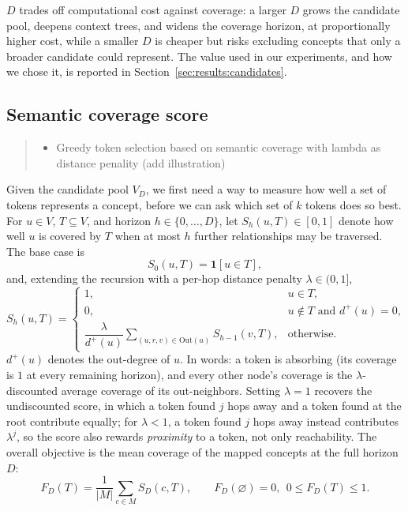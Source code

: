 $D$ trades off computational cost against coverage: a larger $D$ grows the
candidate pool, deepens context trees, and widens the coverage horizon, at
proportionally higher cost, while a smaller $D$ is cheaper but risks
excluding concepts that only a broader candidate could represent. The
value used in our experiments, and how we chose it, is reported in
Section~\ref{sec:results:candidates}.

\subsection{Semantic coverage score}
\label{sec:method:score}
\begin{quote}\small\itshape
\begin{itemize}
\item Greedy token selection based on semantic coverage with lambda as distance penality (add illustration)
\end{itemize}
\end{quote}
Given the candidate pool $V_D$, we first need a way to measure how well a
set of tokens represents a concept, before we can ask which set of $k$
tokens does so best. For $u \in V$, $T \subseteq V$, and horizon
$h \in \{0, \dots, D\}$, let $S_h(u, T) \in [0, 1]$ denote how well $u$ is
covered by $T$ when at most $h$ further relationships may be traversed. The
base case is
\[
S_0(u, T) = \mathbf{1}[u \in T],
\]
and, extending the recursion with a per-hop distance penalty $\lambda \in
(0, 1]$,
\begin{equation}
S_h(u, T) =
\begin{cases}
1, & u \in T, \\[2pt]
0, & u \notin T \text{ and } d^+(u) = 0, \\[2pt]
\dfrac{\lambda}{d^+(u)} \displaystyle\sum_{(u,r,v) \in \mathrm{Out}(u)} S_{h-1}(v, T), & \text{otherwise.}
\end{cases}
\label{eq:coverage}
\end{equation}
$d^+(u)$ denotes the out-degree of $u$. In words: a token is absorbing (its coverage is $1$ at every remaining
horizon), and every other node's coverage is the $\lambda$-discounted
average coverage of its out-neighbors. Setting $\lambda = 1$ recovers the
undiscounted score, in which a token found $j$ hops away and a token found
at the root contribute equally; for $\lambda < 1$, a token found $j$ hops
away instead contributes $\lambda^j$, so the score also rewards
\emph{proximity} to a token, not only reachability. The overall objective
is the mean coverage of the mapped concepts at the full horizon $D$:
\[
F_D(T) = \frac{1}{|M|} \sum_{c \in M} S_D(c, T), \qquad F_D(\varnothing) = 0,\ \ 0 \le F_D(T) \le 1.
\]

